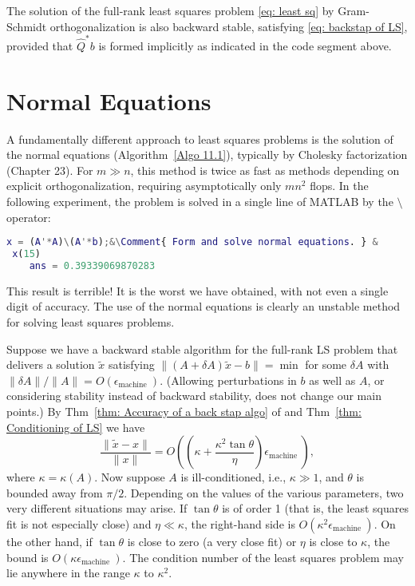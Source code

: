 \begin{theorem}
\label{thm: Backstap of GS for LS}
The solution of the full-rank least squares problem \eqref{eq: least sq} by Gram-Schmidt orthogonalization is also backward stable, satisfying \eqref{eq: backstap of LS}, provided that $\hat{Q}^* b$ is formed implicitly as indicated in the code segment above.
\end{theorem}

\section{Normal Equations} 
A fundamentally different approach to least squares problems is the solution of the normal equations (Algorithm~\ref{Algo 11.1}), typically by Cholesky factorization (Chapter 23). For $m \gg n$, this method is twice as fast as methods depending on explicit orthogonalization, requiring asymptotically only $m n^2$ flops. In the following experiment, the problem is solved in a single line of MATLAB by the $\setminus$ operator:
\begin{lstlisting}[language=Matlab]
 x = (A'*A)\(A'*b);&\Comment{ Form and solve normal equations. } &
 x(15)
    ans = 0.39339069870283
\end{lstlisting}
This result is terrible! It is the worst we have obtained, with not even a single digit of accuracy. The use of the normal equations is clearly an unstable method for solving least squares problems. 

Suppose we have a backward stable algorithm for the full-rank LS problem that delivers a solution $\tilde{x}$ satisfying $\|(A+\delta A) \tilde{x}-b\|=\min$ for some $\delta A$ with $\|\delta A\| /\|A\|=O\left(\epsilon_{\text {machine }}\right)$. (Allowing perturbations in $b$ as well as $A$, or considering stability instead of backward stability, does not change our main points.) By Thm~\ref{thm: Accuracy of a back stap algo} of and Thm~\ref{thm: Conditioning of LS} we have
\[
    \frac{\|\tilde{x}-x\|}{\|x\|}=O\left(\left(\kappa+\frac{\kappa^2 \tan \theta}{\eta}\right) \epsilon_{\text {machine }}\right),
\]
where $\kappa = \kappa(A)$.  Now suppose $A$ is ill-conditioned, i.e., $\kappa \gg 1$, and $\theta$ is bounded away from $\pi / 2$. Depending on the values of the various parameters, two very different situations may arise. If $\tan \theta$ is of order 1 (that is, the least squares fit is not especially close) and $\eta \ll \kappa$, the right-hand side is $O\left(\kappa^2 \epsilon_{\text {machine }}\right)$. On the other hand, if $\tan \theta$ is close to zero (a very close fit) or $\eta$ is close to $\kappa$, the bound is $O\left(\kappa \epsilon_{\text {machine }}\right)$. The condition number of the least squares problem may lie anywhere in the range $\kappa$ to $\kappa^2$.

